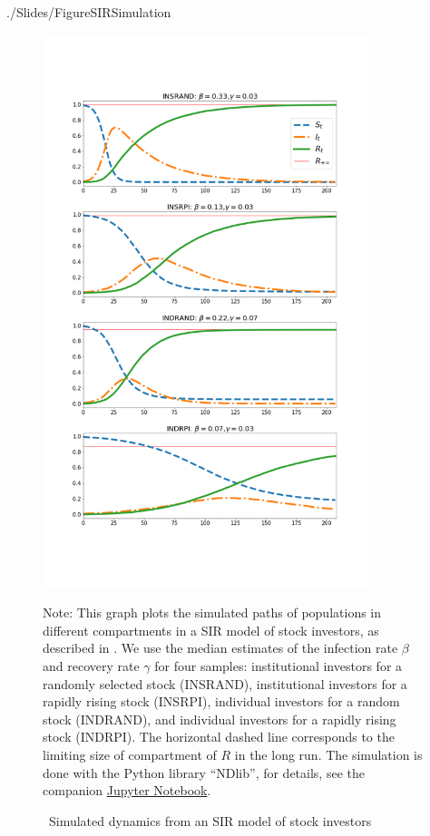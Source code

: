 \newpage

\begin{verbatimwrite}{./Slides/FigureSIRSimulation}%
\begin{figure}[!ht] \centering  %
	\caption{ ~Simulated dynamics from an SIR model of stock investors}
	\label{fig:sir_simulate}
	\includegraphics[width=0.85\textwidth,height=0.85\textheight]{./figures/sir_simulate}
	\begin{flushleft}
	{\footnotesize Note: This graph plots the simulated paths of populations in different compartments in a SIR model of stock investors, as described in \cite{shiller1989survey}. We use the median estimates of the infection rate $\beta$ and recovery rate $\gamma$ for four samples: institutional investors for a randomly selected stock (INSRAND), institutional investors for a rapidly rising stock (INSRPI), individual investors for a random stock (INDRAND), and individual investors for a rapidly rising stock (INDRPI). The horizontal dashed line corresponds to the limiting size of compartment of $R$ in the long run. The simulation is done with the Python library ``NDlib'', for details, see the companion \href{https://github.com/llorracc/EpiExp/blob/master/SIR_Ndlib.ipynb}{Jupyter Notebook}. }
				\end{flushleft}
\end{figure}
\end{verbatimwrite}%

